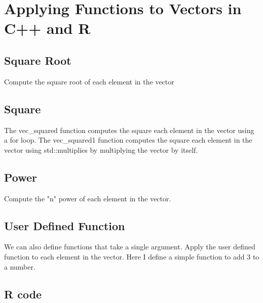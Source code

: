 \chapter{Applying Functions to Vectors in C++ and R}

\section{Square Root}
Compute the square root of each element in the vector

\lstset{language=C++}


\section{Square}
The vec\_squared function computes the square each element in the vector using a for loop. The vec\_squared1 function computes the square each element in the vector using std::multiplies by multiplying the vector by itself.

\lstset{language=C++}


\section{Power}
Compute the "n" power of each element in the vector.

\lstset{language=C++}


\section{User Defined Function}
We can also define functions that take a single argument. Apply the user defined function to each element in the vector. Here I define a simple function to add 3 to a number.

\lstset{language=C++}


\section{R code}
\lstset{language=R}
